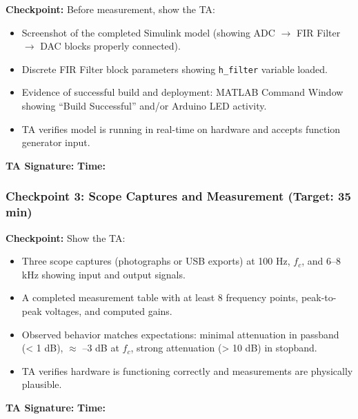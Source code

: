 \documentclass[11pt,letterpaper]{article}
\providecommand{\cpECE}[1]{\textcolor{OliveGreen}{\textbf{Checkpoint:} #1}}
\begin{document}
\cpECE{Before measurement, show the TA:}
\begin{itemize}
    \item[$\square$] Screenshot of the completed Simulink model (showing ADC $\to$ FIR Filter $\to$ DAC blocks properly connected).
    \item[$\square$] Discrete FIR Filter block parameters showing \texttt{h\_filter} variable loaded.
    \item[$\square$] Evidence of successful build and deployment: MATLAB Command Window showing ``Build Successful'' and/or Arduino LED activity.
    \item[$\square$] TA verifies model is running in real-time on hardware and accepts function generator input.
\end{itemize}

\vspace{0.3cm}
\textbf{TA Signature:} \underline{\hspace{2.5cm}} \quad \textbf{Time:} \underline{\hspace{1.5cm}}

\vspace{0.5cm}

\subsubsection*{Checkpoint 3: Scope Captures and Measurement (Target: 35 min)}

\cpECE{Show the TA:}
\begin{itemize}
    \item[$\square$] Three scope captures (photographs or USB exports) at 100 Hz, $f_c$, and 6--8 kHz showing input and output signals.
    \item[$\square$] A completed measurement table with at least 8 frequency points, peak-to-peak voltages, and computed gains.
    \item[$\square$] Observed behavior matches expectations: minimal attenuation in passband (< 1 dB), $\approx$ --3 dB at $f_c$, strong attenuation (> 10 dB) in stopband.
    \item[$\square$] TA verifies hardware is functioning correctly and measurements are physically plausible.
\end{itemize}

\vspace{0.3cm}
\textbf{TA Signature:} \underline{\hspace{2.5cm}} \quad \textbf{Time:} \underline{\hspace{1.5cm}}
\end{document}
